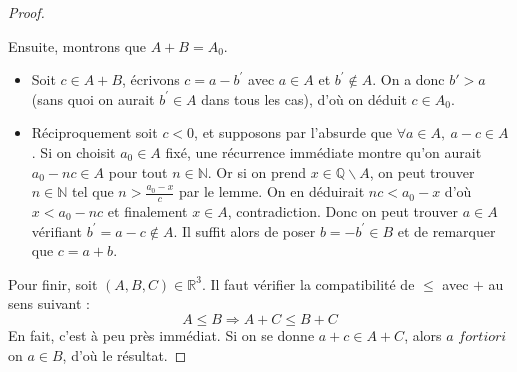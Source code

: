 \documentclass[french]{book}
\newcommand{\N}{\mathbb{N}}
\theoremstyle{plain}
\theoremstyle{definition}
\theoremstyle{remark}
\begin{document}
\begin{proof}
\begin{itemize}
\begin{itemize}
			Ensuite, montrons que $A+B=A_{0}$.
			\begin{itemize}
				\item[*]Soit $c\in A+B$, écrivons $c=a-b^{\prime}$ avec $a\in A$ et $b^{\prime}\notin A$. On a donc $b'>a$ (sans quoi on aurait $b^{\prime}\in A$ dans tous les cas), d'où on déduit $c\in A_{0}$.
				\item[*]Réciproquement soit $c<0$, et supposons par l'absurde que $\forall a\in A,\ a-c\in A$. Si on choisit $a_{0}\in A$ fixé, une récurrence immédiate montre qu'on aurait $a_{0}-nc\in A$ pour tout $n\in\mathbb{N}$. Or si on prend $x\in\mathbb{Q}\backslash A$, on peut trouver $n\in\N$ tel que $\displaystyle n>\frac{a_{0}-x}{c}$ par le lemme. On en déduirait $nc<a_{0}-x$ d'où $x<a_{0}-nc$ et finalement $x\in A$, contradiction. Donc on peut trouver $a\in A$ vérifiant $b^{\prime}=a-c\notin A$. Il suffit alors de poser $b=-b^{\prime}\in B$ et de remarquer que $c=a+b$.
			\end{itemize}
		\end{itemize}
	\end{itemize}
	Pour finir, soit $(A,B,C)\in\mathbb{R}^{3}$. Il faut vérifier la compatibilité de $\le$ avec $+$ au sens suivant :$$A\le B\Rightarrow A+C\le B+C$$ En fait, c'est à peu près immédiat. Si on se donne $a+c\in A+C$, alors $a$ $fortiori$ on $a\in B$, d'où le résultat.
\end{proof}
\end{document}
